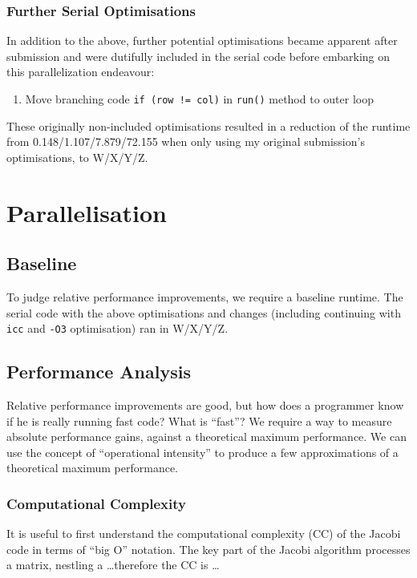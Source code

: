 \documentclass{article}
\begin{document}
\subsubsection{Further Serial Optimisations}
In addition to the above, further potential optimisations became
apparent after submission and were dutifully included in the serial
code before embarking on this parallelization endeavour:

\begin{enumerate}
\item Move branching code \texttt{if (row != col)} in \texttt{run()}
  method to outer loop
\end{enumerate}

These originally non-included optimisations resulted in a reduction of the runtime from 0.148/1.107/7.879/72.155 when only using my original submission's optimisations, to W/X/Y/Z.

\section{Parallelisation}

\subsection{Baseline}
To judge relative performance improvements, we require a baseline
runtime. The serial code with the above optimisations and changes
(including continuing with \texttt{icc} and \texttt{-O3} optimisation)
ran in W/X/Y/Z.

\subsection{Performance Analysis}
Relative performance improvements are good, but how does a programmer
know if he is really running fast code? What is ``fast''? We require a
way to measure absolute performance gains, against a theoretical
maximum performance. We can use the concept of ``operational
intensity'' to produce a few approximations of a theoretical maximum
performance.

\subsubsection{Computational Complexity}
It is useful to first understand the computational complexity (CC) of
the Jacobi code in terms of ``big O'' notation. The key part of the
Jacobi algorithm processes a matrix, nestling a \ldots therefore the
CC is \ldots
\end{document}
